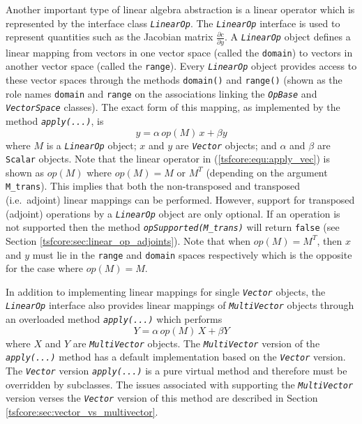 Another important type of linear algebra abstraction is a linear
operator which is represented by the interface class
{}\texttt{\textit{LinearOp}}.  The {}\texttt{\textit{LinearOp}}
interface is used to represent quantities such as the Jacobian matrix
$\frac{\partial c}{\partial y}$. A {}\texttt{\textit{LinearOp}} object
defines a linear mapping from vectors in one vector space (called the
{}\texttt{domain}) to vectors in another vector space (called the
{}\texttt{range}).  Every {}\texttt{\textit{LinearOp}} object provides
access to these vector spaces through the methods {}\texttt{domain()}
and {}\texttt{range()} (shown as the role names {}\texttt{domain} and
{}\texttt{range} on the associations linking the
{}\texttt{\textit{OpBase}} and {}\texttt{\textit{VectorSpace}}
classes).  The exact form of this mapping, as implemented by the
method {}\texttt{\textit{apply(\-...)}}, is
%
\begin{equation}
y = \alpha \, op(M) \, x + \beta y
\label{tsfcore:equ:apply_vec}
\end{equation}
%
where $M$ is a {}\texttt{\textit{LinearOp}} object; $x$ and $y$ are
{}\texttt{\textit{Vector}} objects; and $\alpha$ and $\beta$ are
{}\texttt{Scalar} objects.  Note that the linear operator in
(\ref{tsfcore:equ:apply_vec}) is shown as $op(M)$ where $op(M) = M$ or
$M^T$ (depending on the argument {}\texttt{M\_trans}). This implies
that both the non-transposed and transposed (i.e.~adjoint) linear
mappings can be performed.  However, support for transposed (adjoint)
operations by a {}\texttt{\textit{LinearOp}} object are only optional.
If an operation is not supported then the method
{}\texttt{\textit{opSupported(M\_trans)}} will return {}\texttt{false}
(see Section {}\ref{tsfcore:sec:linear_op_adjoints}).  Note that when
$op(M) = M^T$, then $x$ and $y$ must lie in the {}\texttt{range} and
{}\texttt{domain} spaces respectively which is the opposite for the
case where $op(M) = M$.

In addition to implementing linear mappings for single
{}\texttt{\textit{Vector}} objects, the {}\texttt{\textit{LinearOp}}
interface also provides linear mappings of
{}\texttt{\textit{Multi\-Vector}} objects through an overloaded method
{}\texttt{\textit{apply(\-...)}} which performs
%
\begin{equation}
Y = \alpha \, op(M) \, X + \beta Y
\label{tsfcore:equ:apply_multi_vec}
\end{equation}
%
where $X$ and $Y$ are {}\texttt{\textit{Multi\-Vector}} objects.  The
{}\texttt{\textit{Multi\-Vector}} version of the
{}\texttt{\textit{apply(\-...)}} method has a default implementation
based on the {}\texttt{\textit{Vector}} version.  The
{}\texttt{\textit{Vector}} version {}\texttt{\textit{apply(\-...)}}
is a pure virtual method and therefore must be overridden by
subclasses.  The issues associated with supporting the
{}\texttt{\textit{Multi\-Vector}} version verses the
{}\texttt{\textit{Vector}} version of this method are described in
Section {}\ref{tsfcore:sec:vector_vs_multivector}.

